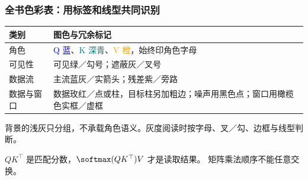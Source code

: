 \subsubsection*{全书色彩表：用标签和线型共同识别}
\label{app:color-semantics}
\begin{center}\small
{}
\begin{tabularx}{\linewidth}{@{}p{26mm}X@{}}\toprule
类别 & 图色与冗余标记\\\midrule
角色 & \textcolor{blue}{Q 蓝}、\textcolor{teal}{K 深青}、\textcolor{orange}{V 橙}，始终印角色字母\\
可见性 & \textcolor{visiblecolor}{可见绿／勾号}；\textcolor{maskedcolor}{遮蔽灰／叉号}\\
数据流 & \textcolor{flowcolor}{主流蓝灰／实箭头}；\textcolor{residualcolor}{残差紫／旁路}\\
数据与窗口 & \textcolor{datacolor}{数据玫红／点或柱}，目标柱另加粗边；噪声用黑色点；窗口用橄榄色实框／虚框\\
\bottomrule\end{tabularx}
\end{center}
背景的浅灰只分组，不承载角色语义。灰度阅读时按字母、叉／勾、边框与线型判断。

\begin{warningbox}
$QK^\top$ 是匹配分数，$\softmax(QK^\top)V$ 才是读取结果。
矩阵乘法顺序不能任意交换。
\end{warningbox}

